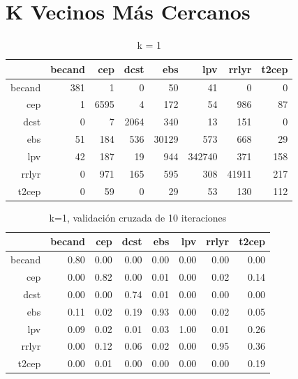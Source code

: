 \documentclass[letterpaper,12pt]{book}
\begin{document}
\section{K Vecinos Más Cercanos}
\begin{table}[ht]
\centering
\caption{k = 1} 
\label{table:cmknn}
\begin{tabular}{rrrrrrrr}
  \hline
 & becand & cep & dcst & ebs & lpv & rrlyr & t2cep \\ 
  \hline
becand & 381 &   1 &   0 &  50 &  41 &   0 &   0 \\ 
  cep &   1 & 6595 &   4 & 172 &  54 & 986 &  87 \\ 
  dcst &   0 &   7 & 2064 & 340 &  13 & 151 &   0 \\ 
  ebs &  51 & 184 & 536 & 30129 & 573 & 668 &  29 \\ 
  lpv &  42 & 187 &  19 & 944 & 342740 & 371 & 158 \\ 
  rrlyr &   0 & 971 & 165 & 595 & 308 & 41911 & 217 \\ 
  t2cep &   0 &  59 &   0 &  29 &  53 & 130 & 112 \\ 
   \hline
\end{tabular}
\end{table}

\begin{table}[ht]
\centering
\caption{k=1, validación cruzada de 10 iteraciones} 
\label{table:cmCvKnn}
\begin{tabular}{rrrrrrrr}
  \hline
 & becand & cep & dcst & ebs & lpv & rrlyr & t2cep \\ 
  \hline
becand & 0.80 & 0.00 & 0.00 & 0.00 & 0.00 & 0.00 & 0.00 \\ 
  cep & 0.00 & 0.82 & 0.00 & 0.01 & 0.00 & 0.02 & 0.14 \\ 
  dcst & 0.00 & 0.00 & 0.74 & 0.01 & 0.00 & 0.00 & 0.00 \\ 
  ebs & 0.11 & 0.02 & 0.19 & 0.93 & 0.00 & 0.02 & 0.05 \\ 
  lpv & 0.09 & 0.02 & 0.01 & 0.03 & 1.00 & 0.01 & 0.26 \\ 
  rrlyr & 0.00 & 0.12 & 0.06 & 0.02 & 0.00 & 0.95 & 0.36 \\ 
  t2cep & 0.00 & 0.01 & 0.00 & 0.00 & 0.00 & 0.00 & 0.19 \\ 
   \hline
\end{tabular}
\end{table}
\end{document}
